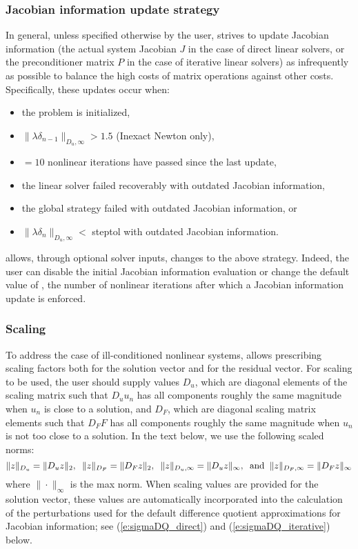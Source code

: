 \subsubsection*{Jacobian information update strategy}
In general, unless specified otherwise by the user, {\kinsol} strives to update
Jacobian information (the actual system Jacobian $J$ in the case of direct linear
solvers, or the preconditioner matrix $P$ in the case of iterative linear solvers)
as infrequently as possible to balance the high costs of matrix operations against 
other costs. Specifically, these updates occur when:
\begin{itemize}
\item the problem is initialized,
\item $\|\lambda\delta_{n-1}\|_{D_u,\infty} > 1.5$ (Inexact Newton only),
\item {}$=10$ nonlinear iterations have passed since the last update,
\item the linear solver failed recoverably with outdated Jacobian information,
\item the global strategy failed with outdated Jacobian information, or
\item $\|\lambda\delta_{n}\|_{D_u,\infty} < $ {\sc steptol} with outdated Jacobian
  information.
\end{itemize}
{\kinsol} allows, through optional solver inputs, changes to the above strategy.
Indeed, the user can disable the initial Jacobian information evaluation or change
the default value of , the number of nonlinear iterations after which a
Jacobian information update is enforced.


\subsubsection*{Scaling}
To address the case of ill-conditioned nonlinear systems, {\kinsol} allows 
prescribing scaling factors both for the solution vector and for the residual 
vector.
For scaling to be used, the user should supply values $D_u$, which are diagonal 
elements of the scaling matrix such that $D_u u_n$ has all components roughly 
the same magnitude when $u_n$ is close to a solution, and $D_F$, which are diagonal
scaling matrix elements such that $D_F F$ has all components roughly the same 
magnitude when $u_n$ is not too close to a solution. 
In the text below, we use the following scaled norms:
\begin{equation}
\|z\|_{D_u} = \|D_u z\|_2, \;\; \|z\|_{D_F} = \|D_F z\|_2, \;\;
\|z\|_{D_u,\infty} = \|D_u z\|_{\infty}, \;\; {\rm and} \;\;
\|z\|_{D_F,\infty} = \|D_F z\|_{\infty}
\end{equation}
where $\| \cdot \|_{\infty}$ is the max norm.  When scaling values are provided 
for the solution vector, these values are automatically incorporated into the 
calculation of the perturbations used for the default difference quotient 
approximations for Jacobian information; see (\ref{e:sigmaDQ_direct}) and 
(\ref{e:sigmaDQ_iterative}) below.

